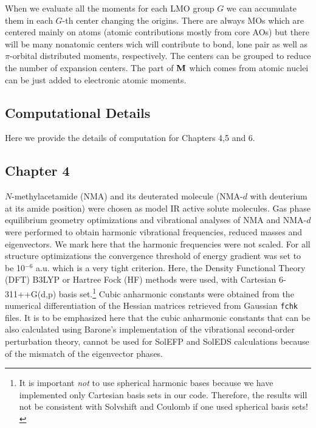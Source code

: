 \documentclass[a4paper,titlepage,twoside,fleqn,12pt]{book}
\begin{document}
\begin{appendices}
\begin{refsection}
When we evaluate all the moments for each LMO group $G$ we can accumulate them in each $G$-th center
changing the origins. There are always MOs which are centered mainly on atoms (atomic contributions
mostly from core AOs) but there will be many nonatomic centers wich will contribute to bond, lone pair
as well as $\pi$\hyp{}orbital distributed moments, respectively. The centers can be grouped to reduce the number
of expansion centers. The part of $\bf M$ which comes from atomic
nuclei can be just added to electronic atomic moments.

\printbibliography[heading=subbibintoc,title={References}]
\end{refsection}


\begin{refsection}
\chapter{Computational Details\label{a:computational-details}}

Here we provide the details of computation for Chapters 4,5 and 6.

\section{Chapter 4}

$N$-methylacetamide (NMA) and its deuterated molecule
(NMA-$d$ with deuterium at its amide position) 
were chosen as model IR active solute molecules. 
Gas phase equilibrium
geometry optimizations and vibrational analyses of NMA
and NMA-$d$ were performed
to obtain harmonic vibrational frequencies, reduced
masses and eigenvectors.
We mark here that the harmonic frequencies were not scaled. 
For all structure optimizations the convergence
threshold of energy gradient was set to be 10$^{-6}$ a.u.
which is a very tight criterion.
Here, the Density Functional Theory (DFT) B3LYP%
or Hartree Fock (HF) methods were used,
with Cartesian 6-311++G(d,p) basis set.\footnote{It is 
important \emph{not} to use spherical harmonic bases
because we have implemented only Cartesian basis sets 
in our code. Therefore, the results will not be consistent
with {\sc Solvshift} and {\sc Coulomb} if one used spherical basis sets!}%
Cubic anharmonic constants were obtained from the numerical
differentiation of the Hessian matrices retrieved from Gaussian
\verb+fchk+ files.
It is to be emphasized here that the cubic anharmonic constants
that can be also calculated using Barone’s implementation%
of
the vibrational second\hyp{}order perturbation theory,
cannot be used for SolEFP and SolEDS calculations because of the mismatch of the eigenvector
phases.


\end{refsection}
\end{appendices}
\end{document}
